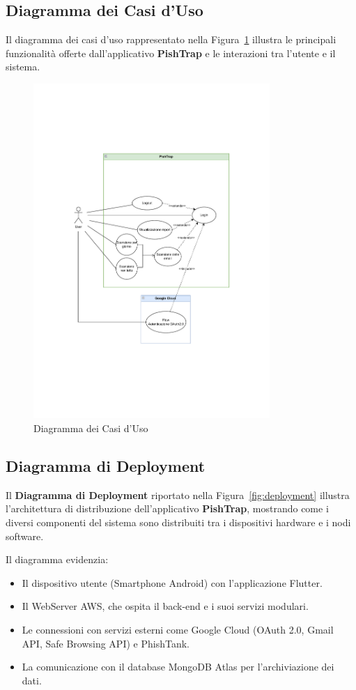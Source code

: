 \subsection{Diagramma dei Casi d'Uso}
Il diagramma dei casi d'uso rappresentato nella Figura~\ref{fig:usecase} illustra le principali funzionalità offerte dall'applicativo \textbf{PishTrap} e le interazioni tra l'utente e il sistema.

\begin{figure}[h!]
\centering
\includegraphics[width=0.8\textwidth]{diagrammiUML/Use case.pdf}
\caption{Diagramma dei Casi d'Uso}
\label{fig:usecase}
\end{figure}

\subsection{Diagramma di Deployment}
Il \textbf{Diagramma di Deployment} riportato nella Figura~\ref{fig:deployment} illustra l'architettura di distribuzione dell'applicativo \textbf{PishTrap}, mostrando come i diversi componenti del sistema sono distribuiti tra i dispositivi hardware e i nodi software.

Il diagramma evidenzia:
\begin{itemize}
    \item Il dispositivo utente (Smartphone Android) con l'applicazione Flutter.
    \item Il WebServer AWS, che ospita il back-end e i suoi servizi modulari.
    \item Le connessioni con servizi esterni come Google Cloud (OAuth 2.0, Gmail API, Safe Browsing API) e PhishTank.
    \item La comunicazione con il database MongoDB Atlas per l'archiviazione dei dati.
\end{itemize}

